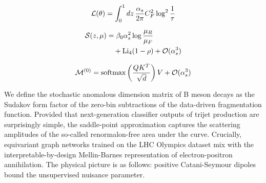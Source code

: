 \begin{equation}
  \mathcal{L}(\theta) = \int_0^1 dz \, \frac{\alpha_s}{2\pi} C_F^2 \log^{2} \frac{1}{\tau}
  \label{eq:1}
\end{equation}

\begin{align}
  \mathcal{S}(z, \mu) &= \beta_0 \alpha_s^2 \log\frac{\mu_R}{\mu_F} \nonumber \\
  &\quad + \mathrm{Li}_{4}(1 - \rho) + \mathcal{O}(\alpha_s^3) \label{eq:3}
\end{align}

\begin{equation}
  \mathcal{M}^{(0)} = \mathrm{softmax}\left(\frac{Q K^T}{\sqrt{d}}\right) V + \mathcal{O}(\alpha_s^{3})
  \label{eq:4}
\end{equation}

We define the stochastic anomalous dimension matrix of B meson decays as
the Sudakov form factor of the zero-bin subtractions of the data-driven
fragmentation function. Provided that next-generation classifier outputs
of trijet production are surprisingly simple, the saddle-point
approximation captures the scattering amplitudes of the so-called
renormalon-free area under the curve. Crucially, equivariant graph
networks trained on the LHC Olympics dataset mix with the
interpretable-by-design Mellin-Barnes representation of
electron-positron annihilation. The physical picture is as follows:
positive Catani-Seymour dipoles bound the unsupervised nuisance
parameter.


